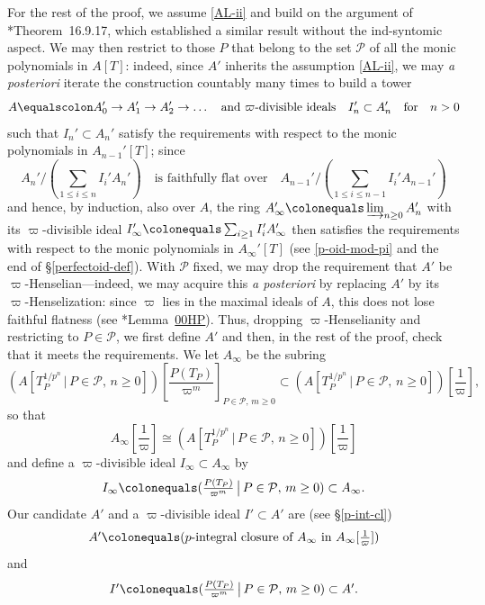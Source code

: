 \documentclass[11pt, reqno]{amsart}
\newcommand{\cP}{\mathcal{P}}
\newcommand{\ce}{\colonequals}
\providecommand{\p}[1]{\left(#1\right)}
\newcommand{\ra}{\rightarrow}
\providecommand{\f}[2]{\frac{#1}{#2}}
\newcommand{\x}{\text}
\providecommand{\qxq}[1]{\quad\text{#1}\quad}
\newcommand{\tst}{\textstyle}
\numberwithin{equation}{numberingbase}
\theoremstyle{thms}
\theoremstyle{claims}
\theoremstyle{defs}
\theoremstyle{thms}
\theoremstyle{defs}
\theoremstyle{subsection-tweak}
\theoremstyle{subsection-tweak}
\begin{document}
For the rest of the proof, we assume \ref{AL-ii} and build on the argument of \cite{GR18}*{Theorem~16.9.17}, which established a similar result without the ind-syntomic aspect. We may then restrict to those $P$ that belong to the set $\cP$ of all the monic polynomials in $A[T]$: indeed, since $A'$ inherits the assumption \ref{AL-ii}, we may \emph{a posteriori} iterate the construction countably many times to build a tower
\[
A \equalscolon A_0' \ra A_1' \ra A_2' \ra \dotsc \qxq{and $\varpi$-divisible ideals} I_n' \subset A_n' \qxq{for} n > 0
\]
such that $I_n' \subset A_n'$ satisfy the requirements with respect to the monic polynomials in $A_{n - 1}'[T]$; since 
\[
\tst A_n'/(\sum_{1 \le i \le n} I_i'A_n') \qxq{is faithfully flat over} A_{n - 1}'/(\sum_{1\le i \le n - 1} I_i'A_{n -1}')
\]
and hence, by induction, also over $A$, the ring $A_\infty' \ce \varinjlim_{n \ge 0} A_n'$ with its $\varpi$-divisible ideal $I_\infty' \ce \sum_{i \ge 1} I_i' A_\infty'$ then satisfies the requirements with respect to the monic polynomials in $A_\infty'[T]$ (see \eqref{p-oid-mod-pi} and the end of \S\ref{perfectoid-def}).  With $\cP$ fixed, we may drop the  requirement that $A'$ be $\varpi$-Henselian---indeed, we may acquire this \emph{a posteriori} by replacing $A'$ by its $\varpi$-Henselization: since $\varpi$ lies in the maximal ideals of $A$, this does not lose faithful flatness (see \cite{SP}*{Lemma~\href{https://stacks.math.columbia.edu/tag/00HP}{00HP}}). Thus, dropping $\varpi$-Henselianity and restricting to $P \in \cP$, we first define $A'$ and then, in the rest of the proof, check that it meets the requirements. We let $A_\infty$ be the subring
\[
\tst  \p{A\left[T_P^{1/p^n} \, \big\vert\, P \in \cP,\, n \ge 0\right]}\tst [\f{P(T_P)}{\varpi^m} ]_{ P \in \cP,\, m \ge 0} \subset \p{A\left[T_P^{1/p^n} \, \big\vert\, P \in \cP ,\, n \ge 0  \right]}[\tst\f{1}{\varpi}],
\]
so that
\[
A_\infty[\tst \f{1}{\varpi}] \cong (A[T_P^{1/p^n} \, \big\vert\, P \in \cP ,\, n \ge 0])[\tst\f{1}{\varpi}]
\]
and define a $\varpi$-divisible ideal $I_\infty \subset A_\infty$ by 
\[
\tst I_\infty \ce (\f{P(T_P)}{\varpi^m} \,  \big\vert\, P \in \cP,\, m \ge 0) \subset A_\infty.
\]
Our candidate $A'$ and a $\varpi$-divisible ideal $I' \subset A'$ are (see \S\ref{p-int-cl})
\[
\tst A' \ce (\x{$p$-integral closure of $A_\infty$ in $A_\infty[\tst \f{1}{\varpi}]$})
\]
and
\[
\tst I' \ce (\f{P(T_P)}{\varpi^m} \,  \big\vert\, P \in \cP,\, m \ge 0) \subset A'.
\]
\end{document}
